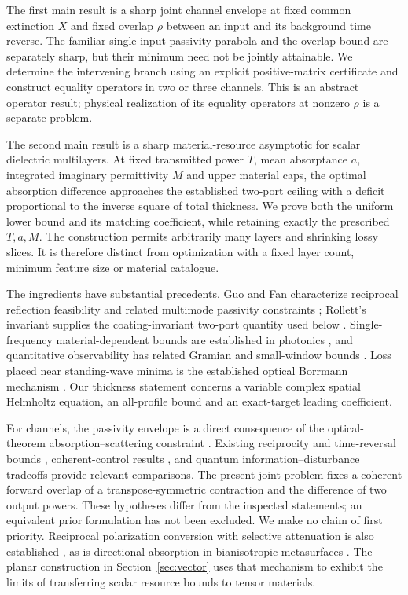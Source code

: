 \documentclass[11pt,a4paper]{article}
\theoremstyle{remark}
\begin{document}
The first main result is a sharp joint channel envelope at fixed common extinction $X$ and fixed overlap $\rho$ between an input and its background time reverse. The familiar single-input passivity parabola and the overlap bound are separately sharp, but their minimum need not be jointly attainable. We determine the intervening branch using an explicit positive-matrix certificate and construct equality operators in two or three channels. This is an abstract operator result; physical realization of its equality operators at nonzero $\rho$ is a separate problem.

The second main result is a sharp material-resource asymptotic for scalar dielectric multilayers. At fixed transmitted power $T$, mean absorptance $a$, integrated imaginary permittivity $M$ and upper material caps, the optimal absorption difference approaches the established two-port ceiling with a deficit proportional to the inverse square of total thickness. We prove both the uniform lower bound and its matching coefficient, while retaining exactly the prescribed $T,a,M$. The construction permits arbitrarily many layers and shrinking lossy slices. It is therefore distinct from optimization with a fixed layer count, minimum feature size or material catalogue.

The ingredients have substantial precedents. Guo and Fan characterize reciprocal reflection feasibility and related multimode passivity constraints \citep{GuoFan2022,GuoFan2024}; Rollett's invariant supplies the coating-invariant two-port quantity used below \citep{Rollett1962}. Single-frequency material-dependent bounds are established in photonics \citep{Kuang2020}, and quantitative observability has related Gramian and small-window bounds \citep{Chitour2010,Hante2012,Privat2013}. Loss placed near standing-wave minima is the established optical Borrmann mechanism \citep{Kozhevnikov2008,Barreaux2017}. Our thickness statement concerns a variable complex spatial Helmholtz equation, an all-profile bound and an exact-target leading coefficient.

For channels, the passivity envelope is a direct consequence of the optical-theorem absorption--scattering constraint \citep{Fleury2014}. Existing reciprocity and time-reversal bounds \citep{SounasAlu2017,Ma2025}, coherent-control results \citep{Li2025}, and quantum information--disturbance tradeoffs \citep{Buscemi2006,Dariano2009} provide relevant comparisons. The present joint problem fixes a coherent forward overlap of a transpose-symmetric contraction and the difference of two output powers. These hypotheses differ from the inspected statements; an equivalent prior formulation has not been excluded. We make no claim of first priority. Reciprocal polarization conversion with selective attenuation is also established \citep{Armitage2014,Potton2004,Khurgin2021}, as is directional absorption in bianisotropic metasurfaces \citep{ManezEspina2026}. The planar construction in Section~\ref{sec:vector} uses that mechanism to exhibit the limits of transferring scalar resource bounds to tensor materials.
\end{document}

